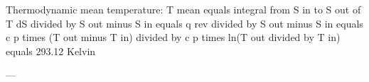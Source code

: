 Thermodynamic mean temperature:  
T mean equals integral from S in to S out of T dS divided by S out minus S in equals q rev divided by S out minus S in equals c p times (T out minus T in) divided by c p times ln(T out divided by T in) equals 293.12 Kelvin  

---